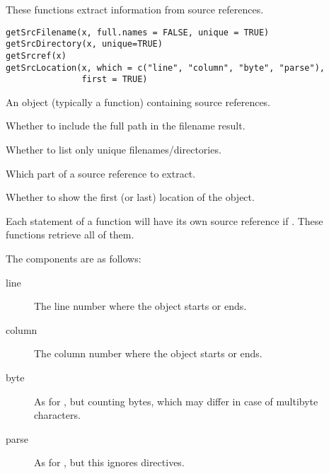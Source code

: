 %
\begin{Description}\relax
These functions extract information from source references.
\end{Description}
%
\begin{Usage}
\begin{verbatim}
getSrcFilename(x, full.names = FALSE, unique = TRUE)
getSrcDirectory(x, unique=TRUE) 
getSrcref(x)
getSrcLocation(x, which = c("line", "column", "byte", "parse"),
               first = TRUE)
\end{verbatim}
\end{Usage}
%
\begin{Arguments}
\begin{ldescription}
\item[\code{x}] 
An object (typically a function) containing source references.

\item[\code{full.names}] 
Whether to include the full path in the filename result.

\item[\code{unique}] 
Whether to list only unique filenames/directories.

\item[\code{which}] 
Which part of a source reference to extract.

\item[\code{first}] 
Whether to show the first (or last) location of the object.

\end{ldescription}
\end{Arguments}
%
\begin{Details}\relax
Each statement of a function will have its own source reference if
.  These functions retrieve all of them.

The components are as follows:
\begin{description}

\item[line] The line number where the object starts or ends.
\item[column] The column number where the object starts or ends.
\item[byte] As for , but counting bytes, which may
differ in case of multibyte characters.
\item[parse] As for , but this ignores  directives.

\end{description}

\end{Details}
